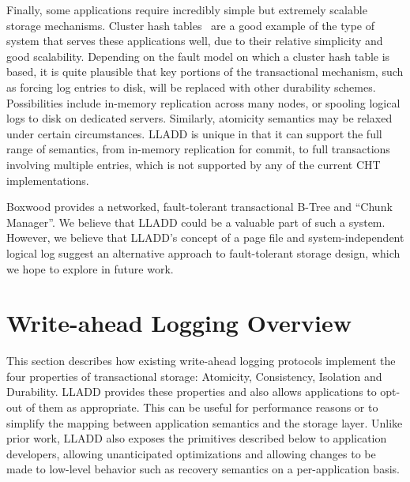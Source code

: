 \documentclass[10pt,letterpaper,twocolumn,english]{article}
\newcommand{\yad}{LLADD\xspace}
\newcommand{\eab}[1]{\textcolor{red}{\bf EAB: #1}}
\newcommand{\rcs}[1]{\textcolor{green}{\bf RCS: #1}}
\begin{document}
Finally, some applications require incredibly simple but extremely
scalable storage mechanisms.  Cluster hash tables~\cite{cht} are a
good example of the type of system that serves these applications
well, due to their relative simplicity and good scalability.
Depending on the fault model on which a cluster hash table is based,
it is quite plausible that key portions of the transactional
mechanism, such as forcing log entries to disk, will be replaced with
other durability schemes.  Possibilities include in-memory replication
across many nodes, or spooling logical logs to disk on dedicated
servers.  Similarly, atomicity semantics may be relaxed under certain
circumstances.  \yad is unique in that it can support the full range
of semantics, from in-memory replication for commit, to full
transactions involving multiple entries, which is not supported by any
of the current CHT implementations.


Boxwood provides a networked, fault-tolerant transactional B-Tree and
``Chunk Manager''.  We believe that \yad could be a valuable part of
such a system.  However, we believe that \yad's concept of a page file
and system-independent logical log suggest an alternative approach to
fault-tolerant storage design, which we hope to explore in future
work.






\section{Write-ahead Logging Overview}

This section describes how existing write-ahead logging protocols
implement the four properties of transactional storage: Atomicity,
Consistency, Isolation and Durability.  \yad provides these
properties and also allows applications to opt-out of
them as appropriate.  This can be useful for
performance reasons or to simplify the mapping between application
semantics and the storage layer.  Unlike prior work, \yad also exposes
the primitives described below to application developers, allowing
unanticipated optimizations and allowing changes to be made to low-level
behavior such as recovery semantics on a per-application basis.
\end{document}
